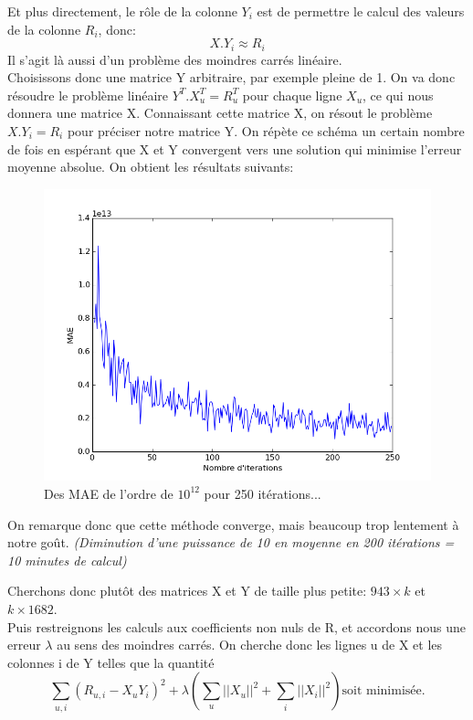 \documentclass[12pt,a4paper]{article}
\begin{document}
Et plus directement, le rôle de la colonne $Y_i$ est de permettre le calcul des valeurs de la colonne $R_i$, donc:
$$X.Y_i \approx R_i$$
Il s'agit là aussi d'un problème des moindres carrés linéaire.\\

Choisissons donc une matrice Y arbitraire, par exemple pleine de 1. On va donc résoudre le problème linéaire $Y^T.X_u^T= R_u^T$ pour chaque ligne $X_u$, ce qui nous donnera une matrice X. Connaissant cette matrice X, on résout le problème $X.Y_i = R_i$ pour préciser notre matrice Y. On répète ce schéma un certain nombre de fois en espérant que X et Y convergent vers une solution qui minimise l'erreur moyenne absolue. On obtient les résultats suivants:

\begin{figure}[h]
\centering
\includegraphics[scale=0.5]{least-squares-MAE.png}
\caption{Des MAE de l'ordre de $10^{12}$ pour 250 itérations...}
\end{figure}
On remarque donc que cette méthode converge, mais beaucoup trop lentement à notre goût. \textit{(Diminution d'une puissance de 10 en moyenne en 200 itérations = 10 minutes de calcul)}

\newpage
Cherchons donc plutôt des matrices X et Y de taille plus petite: $943\times k$ et $k\times 1682$.\\
Puis restreignons les calculs aux coefficients non nuls de R, et accordons nous une erreur $\lambda$ au sens des moindres carrés. On cherche donc les lignes u de X et les colonnes i de Y telles que la quantité
$$\sum_{u,i} (R_{u,i}-X_uY_i)^2+\lambda \left(\sum_u ||X_u||^2 + \sum_i ||X_i||^2 \right) \text{soit minimisée.}$$
\end{document}
